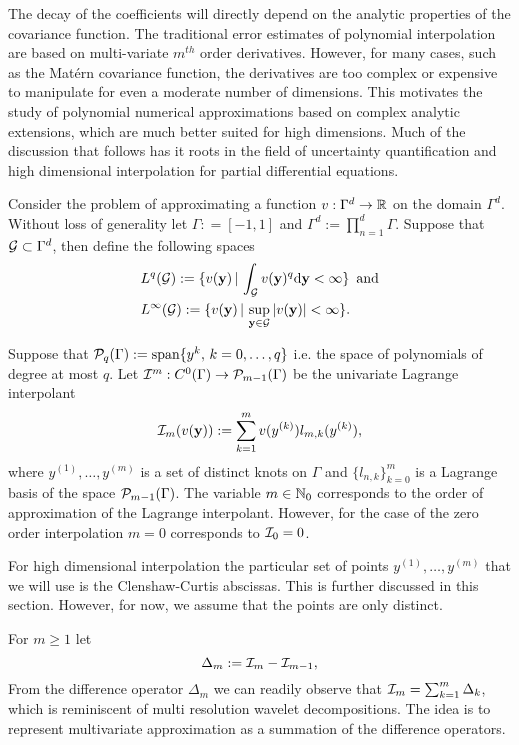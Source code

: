 \documentclass[11pt,final]{amsart}       %
\begin{document}
The decay of the coefficients will directly depend on the analytic
properties of the covariance function. The traditional error estimates
of polynomial interpolation are based on multi-variate $m^{th}$ order
derivatives. However, for many cases, such as the Mat\'{e}rn
covariance function, the derivatives are too complex or expensive to
manipulate for even a moderate number of dimensions. This motivates
the study of polynomial numerical approximations based on complex
analytic extensions, which are much better suited for high dimensions.
Much of the discussion that follows has it roots in the field of
uncertainty quantification and high dimensional interpolation
\cite{nobile2008a,Castrillon2016,Griebel2016}
for partial differential
equations.


Consider the problem of approximating a function $v: \Gamma^{d}
\rightarrow \Bbb{R}$ on the domain $\Gamma^{d}$.  Without loss of
generality let $\Gamma : = [-1, 1]$ and $\Gamma^{d} := \prod_{n =
  1}^{d} \Gamma$. Suppose that $\mathcal{G} \subset \Gamma^{d}$, then define
the following spaces
\[
\begin{split}
  &
L^q(\mathcal{G}) := \{ v(\mathbf{y})\, | \, \int_{\mathcal{G}} v(\mathbf{y})^q \text{d}
\mathbf{y} < \infty  \}
\,\,\,
\mbox{and} \\
&
L^{\infty}(\mathcal{G}) := \{ v(\mathbf{y})\, | \, \sup_{\mathbf{y} \in \mathcal{G}} |v(\mathbf{y})|
< \infty  \}.
\end{split}
\]


Suppose that ${\mathcal P}_{ q}(\Gamma):=\text{\rm span}\{y^k,\,k=0,\dots,q\}$
i.e. the space of polynomials of degree at most $q$. Let ${\mathcal I}^{m} :
C^{0}(\Gamma) \rightarrow {\mathcal P}_{m-1}(\Gamma)$ be the univariate
Lagrange interpolant
\[
{\mathcal I}_{m}(v(\mathbf{y})):=
\sum_{k=1}^{m}v(y^{(k)})l_{m,k}(y^{(k)}),
\]
where $y^{(1)}, \dots, y^{(m)}$ is a set of distinct knots on $\Gamma$
and $\{ l_{n,k} \}_{k=0}^{m}$ is a Lagrange basis of the space
${\mathcal P}_{m-1}(\Gamma)$. The variable $m \in \mathbb{N}_0$
corresponds to the order of approximation of the
Lagrange interpolant. However, for the case of the zero order
interpolation $m = 0$ corresponds to ${\mathcal I}_{0} = 0$.


\begin{remark}
For high dimensional interpolation the particular set of points
$y^{(1)}, \dots, y^{(m)}$ that we will use is the Clenshaw-Curtis
abscissas.  This is further discussed in this section. However, for
now, we assume that the points are only distinct.
  \end{remark}


For $m \geq 1$ let
\[
\Delta_{m}
:= {\mathcal I}_{m}-{\mathcal I}_{m-1},
\]
From the difference operator $\Delta_{m}$ we can readily observe that
${\mathcal I}_{m} = \sum_{k=1}^{m} \Delta_{k}$, which is reminiscent of multi
resolution wavelet decompositions. The idea is to represent
multivariate approximation as a summation of the difference operators.
\end{document}
